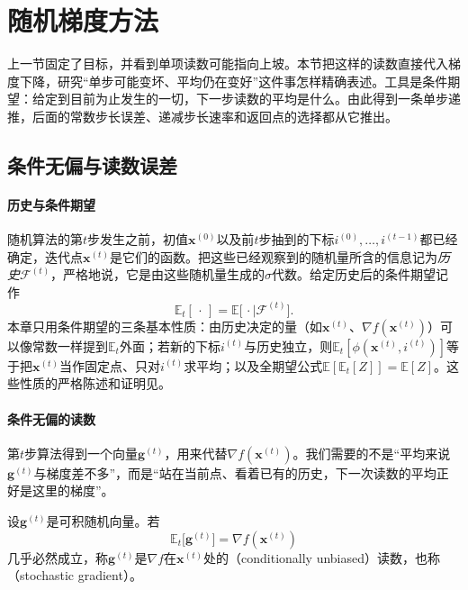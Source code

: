 \section{随机梯度方法}
\label{sec:opt-sto-sgd}

上一节固定了目标，并看到单项读数可能指向上坡。本节把这样的读数直接代入梯度下降，研究“单步可能变坏、平均仍在变好”这件事怎样精确表述。工具是条件期望：给定到目前为止发生的一切，下一步读数的平均是什么。由此得到一条单步递推，后面的常数步长误差、递减步长速率和返回点的选择都从它推出。

\subsection{条件无偏与读数误差}
\label{sec:opt-sto-unbiased}

\paragraph{历史与条件期望}
随机算法的第$t$步发生之前，初值$\bm x^{(0)}$以及前$t$步抽到的下标$i^{(0)},\dots,i^{(t-1)}$都已经确定，迭代点$\bm x^{(t)}$是它们的函数。把这些已经观察到的随机量所含的信息记为\emph{历史}$\mathcal F^{(t)}$，严格地说，它是由这些随机量生成的$\sigma$代数。给定历史后的条件期望记作
\[
  \mathbb E_t[\,\cdot\,]=\mathbb E\bigl[\,\cdot\mid\mathcal F^{(t)}\bigr].
\]
本章只用条件期望的三条基本性质：由历史决定的量（如$\bm x^{(t)}$、$\nabla f(\bm x^{(t)})$）可以像常数一样提到$\mathbb E_t$外面；若新的下标$i^{(t)}$与历史独立，则$\mathbb E_t[\phi(\bm x^{(t)},i^{(t)})]$等于把$\bm x^{(t)}$当作固定点、只对$i^{(t)}$求平均；以及全期望公式$\mathbb E[\mathbb E_t[Z]]=\mathbb E[Z]$。这些性质的严格陈述和证明见。

\paragraph{条件无偏的读数}
第$t$步算法得到一个向量$\bm g^{(t)}$，用来代替$\nabla f(\bm x^{(t)})$。我们需要的不是“平均来说$\bm g^{(t)}$与梯度差不多”，而是“站在当前点、看着已有的历史，下一次读数的平均正好是这里的梯度”。

\begin{definition}[条件无偏读数]
\label{def:opt-sto-unbiased}
设$\bm g^{(t)}$是可积随机向量。若
\[
  \mathbb E_t\bigl[\bm g^{(t)}\bigr]=\nabla f(\bm x^{(t)})
\]
几乎必然成立，称$\bm g^{(t)}$是$\nabla f$在$\bm x^{(t)}$处的（conditionally unbiased）读数，也称（stochastic gradient）。
\end{definition}

